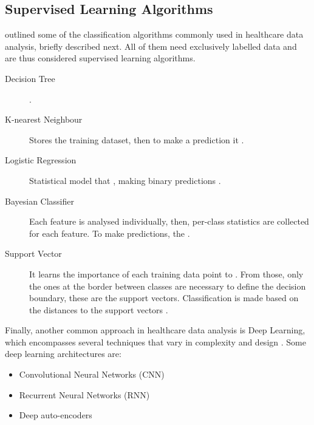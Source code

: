 \documentclass[a4paper,12pt]{article}
\begin{document}
\subsection{Supervised Learning Algorithms}

\textcite{Jothi2015} outlined some of the classification algorithms commonly used in healthcare data analysis, briefly described next. All of them need exclusively labelled data and are thus considered supervised learning algorithms.

\begin{description}
    \item[Decision Tree] .
    \item[K-nearest Neighbour] Stores the training dataset, then to make a prediction it .
    \item[Logistic Regression] Statistical model that , making binary predictions \parencite{Nick2007}.
    \item[Bayesian Classifier] Each feature is analysed individually, then, per-class statistics are collected for each feature. 
    To make predictions, the .
    \item[Support Vector] It learns the importance of each training data point to .
    From those, only the ones at the border between classes are necessary to define the decision boundary, these are the support vectors.
    Classification is made based on the distances to the support vectors \parencite[98]{Mueller2017}.
\end{description}


Finally, another common approach in healthcare data analysis is Deep Learning, which encompasses several techniques that vary in complexity and design \parencite{Ibrahim2021}. Some deep learning architectures are:

\begin{itemize}
 \item Convolutional Neural Networks (CNN)
 \item Recurrent Neural Networks (RNN)
 \item Deep auto-encoders
\end{itemize}
\end{document}
